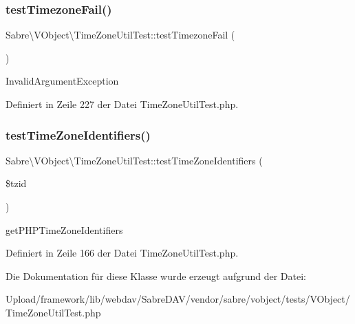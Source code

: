 \subsubsection{\texorpdfstring{test\+Timezone\+Fail()}{testTimezoneFail()}}
{\footnotesize\ttfamily Sabre\textbackslash{}\+V\+Object\textbackslash{}\+Time\+Zone\+Util\+Test\+::test\+Timezone\+Fail (\begin{DoxyParamCaption}{ }\end{DoxyParamCaption})}

Invalid\+Argument\+Exception 

Definiert in Zeile 227 der Datei Time\+Zone\+Util\+Test.\+php.

\mbox{\label{class_sabre_1_1_v_object_1_1_time_zone_util_test_a442216af77c28e7cf8dc4fad818af12d}} 
\subsubsection{\texorpdfstring{test\+Time\+Zone\+Identifiers()}{testTimeZoneIdentifiers()}}
{\footnotesize\ttfamily Sabre\textbackslash{}\+V\+Object\textbackslash{}\+Time\+Zone\+Util\+Test\+::test\+Time\+Zone\+Identifiers (\begin{DoxyParamCaption}\item[{}]{\$tzid }\end{DoxyParamCaption})}

get\+P\+H\+P\+Time\+Zone\+Identifiers 

Definiert in Zeile 166 der Datei Time\+Zone\+Util\+Test.\+php.



Die Dokumentation für diese Klasse wurde erzeugt aufgrund der Datei\+:\begin{DoxyCompactItemize}
\item 
Upload/framework/lib/webdav/\+Sabre\+D\+A\+V/vendor/sabre/vobject/tests/\+V\+Object/Time\+Zone\+Util\+Test.\+php\end{DoxyCompactItemize}

